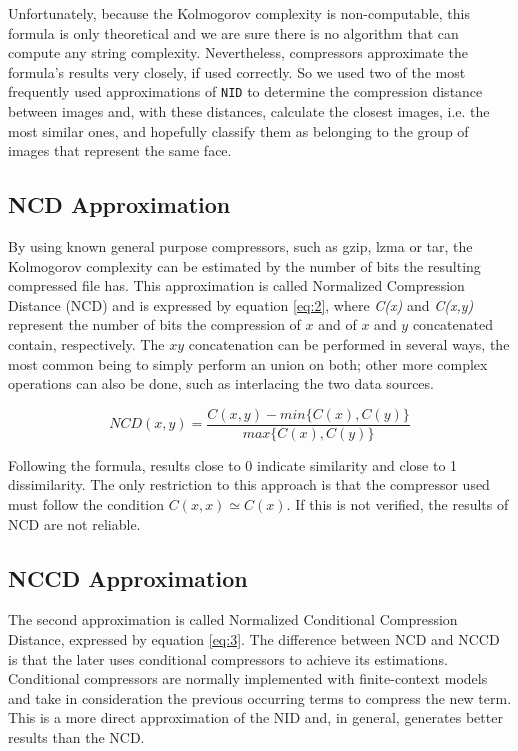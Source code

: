 \documentclass[12pt]{article}
\begin{document}
Unfortunately, because the Kolmogorov complexity is non-computable, this formula is only theoretical and we are sure there is no algorithm that can compute 
any string complexity. 
Nevertheless, compressors approximate the formula's results very closely, if used correctly. 
So we used two of the most frequently used approximations of \texttt{NID} to determine the compression distance between images and, with these distances, 
calculate the closest images, i.e. the most similar ones, and hopefully classify them as belonging to the group of images that represent the same face.

\subsection{NCD Approximation} %

By using known general purpose compressors, such as gzip, lzma or tar, the Kolmogorov complexity can be estimated by the number of bits the resulting 
compressed file has. 
This approximation is called Normalized Compression Distance (NCD) and is expressed by equation \ref{eq:2}, where \textit{C(x)} and \textit{C(x,y)} represent 
the number of bits the compression of $x$ and of $x$ and $y$ concatenated contain, respectively.
The $xy$ concatenation can be performed in several ways, the most common being to simply perform an union on both; other more complex operations can also be done, 
such as interlacing the two data sources. 

\begin{equation}\label{eq:2}
  NCD(x,y) = \frac{C(x,y)-min\{C(x), C(y)\}}{max\{C(x),C(y)\}}
\end{equation}

Following the formula, results close to 0 indicate similarity and close to 1 dissimilarity. 
The only restriction to this approach is that the compressor used must follow the condition $C(x,x) \simeq C(x)$.
If this is not verified, the results of NCD are not reliable. 

\subsection{NCCD Approximation} %

The second approximation is called Normalized Conditional Compression Distance, expressed by equation \ref{eq:3}.
The difference between NCD and NCCD is that the later uses conditional compressors to achieve its estimations. 
Conditional compressors are normally implemented with finite-context models and take in consideration the previous occurring terms to compress the new term. 
This is a more direct approximation of the NID and, in general, generates better results than the NCD.
\end{document}
